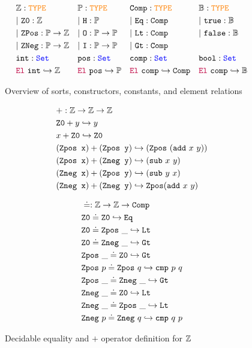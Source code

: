 \begin{figure}
\centering
\begin{align*}\label{eq:eq1}
&\bb{Z}: \type & &\bb{P}: \type  & &\tt{Comp}: \type & &\bb{B}: \type \\
&|~\tt{Z0}: \bb{Z} & &|~\tt{H} : \bb{P} & &|~\tt{Eq}: \tt{Comp} & &|~\tt{true}: \bb{B} \\
&|~\tt{ZPos}: \bb{P} \ra \bb{Z} & &|~\tt{O}: \bb{P} \ra \bb{P} & &|~\tt{Lt}: \tt{Comp} & &|~\tt{false}: \bb{B} \\
&|~\tt{ZNeg}: \bb{P} \ra \bb{Z} & &|~\tt{I}: \bb{P} \ra \bb{P} & &|~\tt{Gt}: \tt{Comp} & &\\
&\tt{int}: \set & &\tt{pos}: \set & &\tt{comp}: \set & &\tt{bool}: \set \\
&\el~\tt{int} \re \bb{Z} & &\el~\tt{pos} \re \bb{P} & &\el~\tt{comp} \re \tt{Comp} & &\el~\tt{comp} \re \bb{B}
\end{align*}
\caption{Overview of sorts, constructors, constants, and element relations}
\label{fig:sorts-constructors}
\end{figure}

\begin{figure}
\centering
\begin{minipage}[t]{0.48\textwidth}
\begin{align*}
&+: \bb{Z} \ra \bb{Z} \ra \bb{Z} \\
& \tt{Z0} + y \re y \\
& x + \tt{Z0} \re \tt{Z0} \\
& (\tt{Zpos x}) + (\tt{Zpos y}) \re (\tt{Zpos}~(\tt{add}~x~y))  \\
& (\tt{Zpos x}) + (\tt{Zneg y}) \re (\tt{sub}~x~y)  \\
& (\tt{Zneg x}) + (\tt{Zpos y}) \re (\tt{sub}~y~x)  \\
& (\tt{Zneg x}) + (\tt{Zneg y}) \re \tt{Zpos}(\tt{add}~x~y)  \\
\end{align*}
\hfill
\end{minipage}
\begin{minipage}[t]{0.48\textwidth}
\begin{align*}
&\doteq : \bb{Z} \ra \bb{Z} \ra \tt{Comp} \\
& \tt{Z0} \doteq \tt{Z0} \re \tt{Eq} \\
& \tt{Z0} \doteq \tt{Zpos}~\_ \re \tt{Lt} \\
& \tt{Z0} \doteq \tt{Zneg}~\_ \re \tt{Gt} \\
& \tt{Zpos}~\_ \doteq \tt{Z0} \re \tt{Gt} \\
& \tt{Zpos}~p \doteq \tt{Zpos}~q \re \tt{cmp}~p~q \\
& \tt{Zpos}~\_ \doteq \tt{Zneg}~\_ \re \tt{Gt} \\
& \tt{Zneg}~\_ \doteq \tt{Z0} \re \tt{Lt} \\
& \tt{Zneg}~\_ \doteq \tt{Zpos}~\_ \re \tt{Lt} \\
& \tt{Zneg}~p \doteq \tt{Zneg}~q \re \tt{cmp}~q~p \\
\end{align*}
\end{minipage}
\caption{Decidable equality and $+$ operator definition for $\bb{Z}$}
\label{fig:arith-ops}
\end{figure}

